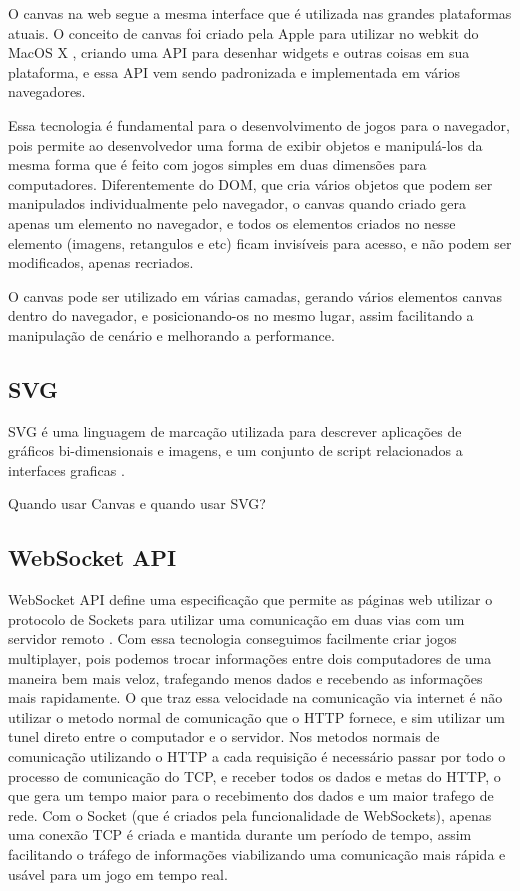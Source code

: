 O canvas na web segue a mesma interface que é utilizada nas grandes
plataformas atuais. O conceito de canvas foi criado pela Apple para
utilizar no webkit do MacOS X \cite{lubbers2010pro}, criando uma API
para desenhar widgets e outras coisas em sua plataforma, e essa API
vem sendo padronizada e implementada em vários navegadores.

Essa tecnologia é fundamental para o desenvolvimento de jogos para
o navegador, pois permite ao desenvolvedor uma forma de exibir
objetos e manipulá-los da mesma forma que é feito com jogos
simples em duas dimensões para computadores.
Diferentemente do DOM, que cria vários objetos que podem ser
manipulados individualmente pelo navegador, o canvas quando criado
gera apenas um elemento no navegador, e todos os elementos criados
no nesse elemento (imagens, retangulos e etc) ficam invisíveis para acesso, e
não podem ser modificados, apenas recriados.

O canvas pode ser utilizado em várias camadas, gerando vários
elementos canvas dentro do navegador, e posicionando-os no mesmo
lugar, assim facilitando a manipulação de cenário e melhorando a
performance.


\subsection{SVG}
SVG é uma linguagem de marcação utilizada para descrever aplicações de gráficos
bi-dimensionais e imagens, e um conjunto de script relacionados a
interfaces graficas \cite{w3csvg}.

Quando usar Canvas e quando usar SVG?

\subsection{WebSocket API}

WebSocket API define uma especificação que permite as páginas web
utilizar o protocolo de Sockets para utilizar uma comunicação em duas
vias com um servidor remoto \cite{w3cwebsockets}. Com essa tecnologia
conseguimos facilmente criar jogos multiplayer, pois podemos
trocar informações entre dois computadores de uma maneira bem mais
veloz, trafegando menos dados e recebendo as informações mais
rapidamente.
O que traz essa velocidade na comunicação via internet é não utilizar
o metodo normal de comunicação que o HTTP fornece, e sim utilizar um
tunel direto entre o computador e o servidor.
Nos metodos normais de comunicação utilizando o HTTP a cada requisição
é necessário passar por todo o processo de comunicação do TCP, e
receber todos os dados e metas do HTTP, o que gera um tempo maior para
o recebimento dos dados e um maior trafego de rede. Com o Socket (que
é criados pela funcionalidade de WebSockets), apenas uma conexão TCP é
criada e mantida durante um período de tempo, assim facilitando o
tráfego de informações viabilizando uma comunicação mais rápida e
usável para um jogo em tempo real.


